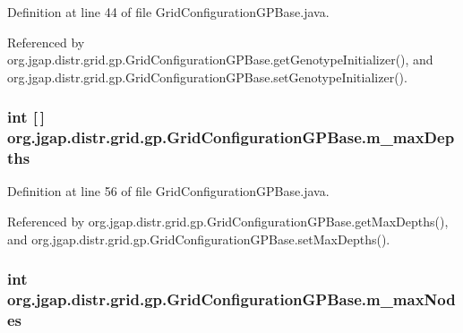Definition at line 44 of file Grid\-Configuration\-G\-P\-Base.\-java.



Referenced by org.\-jgap.\-distr.\-grid.\-gp.\-Grid\-Configuration\-G\-P\-Base.\-get\-Genotype\-Initializer(), and org.\-jgap.\-distr.\-grid.\-gp.\-Grid\-Configuration\-G\-P\-Base.\-set\-Genotype\-Initializer().

\hypertarget{classorg_1_1jgap_1_1distr_1_1grid_1_1gp_1_1_grid_configuration_g_p_base_ab71e5873e0a0a4c83e0d102a92bc333f}{
\subsubsection[{m\-\_\-max\-Depths}]{\setlength{\rightskip}{0pt plus 5cm}int \mbox{[}$\,$\mbox{]} org.\-jgap.\-distr.\-grid.\-gp.\-Grid\-Configuration\-G\-P\-Base.\-m\-\_\-max\-Depths\hspace{0.3cm}{\ttfamily [private]}}}\label{classorg_1_1jgap_1_1distr_1_1grid_1_1gp_1_1_grid_configuration_g_p_base_ab71e5873e0a0a4c83e0d102a92bc333f}


Definition at line 56 of file Grid\-Configuration\-G\-P\-Base.\-java.



Referenced by org.\-jgap.\-distr.\-grid.\-gp.\-Grid\-Configuration\-G\-P\-Base.\-get\-Max\-Depths(), and org.\-jgap.\-distr.\-grid.\-gp.\-Grid\-Configuration\-G\-P\-Base.\-set\-Max\-Depths().

\hypertarget{classorg_1_1jgap_1_1distr_1_1grid_1_1gp_1_1_grid_configuration_g_p_base_a593ec73125a1f428e3473ee2e42db9c4}{
\subsubsection[{m\-\_\-max\-Nodes}]{\setlength{\rightskip}{0pt plus 5cm}int org.\-jgap.\-distr.\-grid.\-gp.\-Grid\-Configuration\-G\-P\-Base.\-m\-\_\-max\-Nodes\hspace{0.3cm}{\ttfamily [private]}}}\label{classorg_1_1jgap_1_1distr_1_1grid_1_1gp_1_1_grid_configuration_g_p_base_a593ec73125a1f428e3473ee2e42db9c4}


